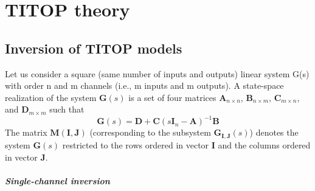 \chapter{TITOP theory}


\section{Inversion of TITOP models}
\label{chap:appendix1}
Let us consider a square (same number of inputs and outputs) linear system G(s) with order n and m channels (i.e., m inputs and m outputs). A state-space realization of the system $\mathbf{G}(s)$ is a set of four matrices $\mathbf{A}_{n\times n}$, $\mathbf{B}_{n\times m}$, $\mathbf{C}_{m\times n}$, and $\mathbf{D}_{m\times m}$ such that
\begin{equation}
	\mathbf{G}(s) = \mathbf{D}+ \mathbf{C}\left(s\mathbf{I}_n-\mathbf{A}\right)^{-1}\mathbf{B}
\end{equation}
The matrix $\mathbf{M}(\mathbf{I},\mathbf{J})$ (corresponding to the subsystem $\mathbf{G}_{\mathbf{I},\mathbf{J}}(s)$) denotes the system $\mathbf{G}(s)$ restricted to the rows ordered in vector $\mathbf{I}$ and the columns ordered in vector $\mathbf{J}$. 

\paragraph{Single-channel inversion}

